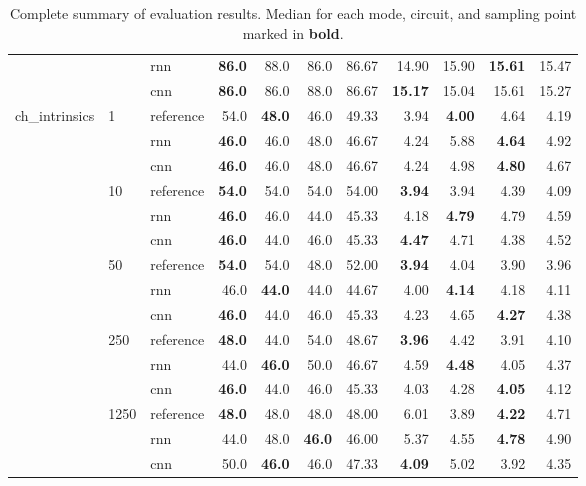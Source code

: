 \begin{table}
{\begin{tabular}{lllrrrrrrrr}
	&      & rnn &          \textbf{86.0} &   88.0 &   86.0 &   86.67 &         14.90 &  15.90 &  \textbf{15.61} &  15.47 \\
	&      & cnn &          \textbf{86.0} &   86.0 &   88.0 &   86.67 &         \textbf{15.17} &  15.04 &  15.61 &  15.27 \\
	ch\_intrinsics & 1    & reference &          54.0 &   \textbf{48.0} &   46.0 &   49.33 &          3.94 &   \textbf{4.00} &   4.64 &   4.19 \\
	&      & rnn &          \textbf{46.0} &   46.0 &   48.0 &   46.67 &          4.24 &   5.88 &   \textbf{4.64} &   4.92 \\
	&      & cnn &          \textbf{46.0} &   46.0 &   48.0 &   46.67 &          4.24 &   4.98 &   \textbf{4.80} &   4.67 \\
	& 10   & reference &          \textbf{54.0} &   54.0 &   54.0 &   54.00 &          \textbf{3.94} &   3.94 &   4.39 &   4.09 \\
	&      & rnn &          \textbf{46.0} &   46.0 &   44.0 &   45.33 &          4.18 &   \textbf{4.79} &   4.79 &   4.59 \\
	&      & cnn &          \textbf{46.0} &   44.0 &   46.0 &   45.33 &          \textbf{4.47} &   4.71 &   4.38 &   4.52 \\
	& 50   & reference &          \textbf{54.0} &   54.0 &   48.0 &   52.00 &          \textbf{3.94} &   4.04 &   3.90 &   3.96 \\
	&      & rnn &          46.0 &   \textbf{44.0} &   44.0 &   44.67 &          4.00 &   \textbf{4.14} &   4.18 &   4.11 \\
	&      & cnn &          \textbf{46.0} &   44.0 &   46.0 &   45.33 &          4.23 &   4.65 &   \textbf{4.27} &   4.38 \\
	& 250  & reference &          \textbf{48.0} &   44.0 &   54.0 &   48.67 &          \textbf{3.96} &   4.42 &   3.91 &   4.10 \\
	&      & rnn &          44.0 &   \textbf{46.0} &   50.0 &   46.67 &          4.59 &   \textbf{4.48} &   4.05 &   4.37 \\
	&      & cnn &          \textbf{46.0} &   44.0 &   46.0 &   45.33 &          4.03 &   4.28 &   \textbf{4.05} &   4.12 \\
	& 1250 & reference &          \textbf{48.0} &   48.0 &   48.0 &   48.00 &          6.01 &   3.89 &   \textbf{4.22} &   4.71 \\
	&      & rnn &          44.0 &   48.0 &  \textbf{46.0} &   46.00 &          5.37 &   4.55 &   \textbf{4.78} &   4.90 \\
	&      & cnn &          50.0 &   \textbf{46.0} &   46.0 &   47.33 &          \textbf{4.09} &   5.02 &   3.92 &   4.35 \\
	\bottomrule
\end{tabular}
}
\caption{Complete summary of evaluation results. Median for each mode, circuit, and sampling point marked in \textbf{bold}.}
\label{table:eval-complete}
\end{table}

